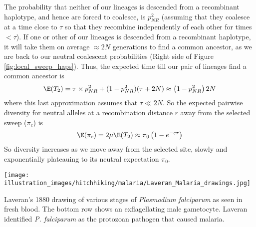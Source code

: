 The probability that neither of our lineages is descended from a
recombinant haplotype, and hence are forced to coalesce, is $p_{NR}^2$ (assuming that
they coalesce at a time close to $\tau$ so that they recombine
independently of each other for times $< \tau$).
If one or other of our lineages is descended from a recombinant haplotype, it will take them on average
$\approx 2N$ generations to find a common ancestor, as we are back to our
neutral coalescent probabilities (Right side of Figure \ref{fig:local_sweep_haps}). Thus, the expected time
till our pair of lineages find a common ancestor is
\begin{equation}
\E(T_2)  = \tau \times p_{NR}^2 +(1-p_{NR}^2) (\tau +2N) \approx
\left(1-p_{NR}^2 \right) 2N
\end{equation}
where this last approximation assumes that $\tau \ll 2N$. So the
expected pairwise diversity for neutral alleles at a recombination
distance $r$ away from the selected sweep ($\pi_c$) is
\begin{equation}
\E(\pi_c) = 2\mu \E(T_2)  \approx \pi_0 \left(1-e^{-c\tau} \right) \label{eqn:pi_HH}
\end{equation}
So diversity increases as we move away from the selected site,
slowly and exponentially plateauing to its neutral expectation
$\pi_0$.\\
\begin{marginfigure}
\begin{center}
\texttt{[image: illustration\_images/hitchhiking/malaria/Laveran\_Malaria\_drawings.jpg]}
\end{center}
\caption{Laveran's 1880 drawing of various stages of {\it Plasmodium
    falciparum} as seen in fresh blood. The bottom row shows an
  exflagellating male gametocyte. Laveran identified {\it P. falciparum} as the
  protozoan pathogen that caused malaria. } \label{fig:malaria}
\end{marginfigure}

